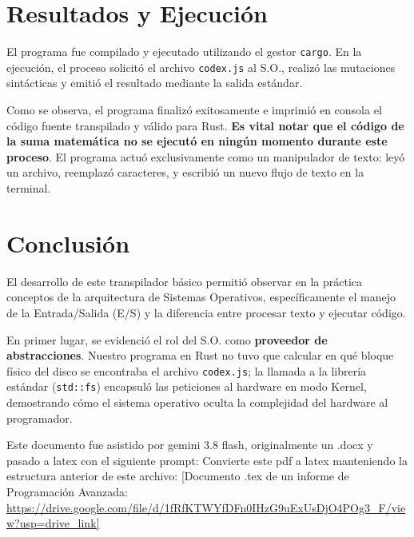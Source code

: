 \documentclass[11pt, letterpaper]{article}
\begin{document}
			


			\section{Resultados y Ejecución}
			
			El programa fue compilado y ejecutado utilizando el gestor \texttt{cargo}. En la ejecución, el proceso solicitó el archivo \texttt{codex.js} al S.O., realizó las mutaciones sintácticas y emitió el resultado mediante la salida estándar.

			
			Como se observa, el programa finalizó exitosamente e imprimió en consola el código fuente transpilado y válido para Rust. \textbf{Es vital notar que el código de la suma matemática no se ejecutó en ningún momento durante este proceso}. El programa actuó exclusivamente como un manipulador de texto: leyó un archivo, reemplazó caracteres, y escribió un nuevo flujo de texto en la terminal.

			\section{Conclusión}
			
			El desarrollo de este transpilador básico permitió observar en la práctica conceptos de la arquitectura de Sistemas Operativos, específicamente el manejo de la Entrada/Salida (E/S) y la diferencia entre procesar texto y ejecutar código.
			
			En primer lugar, se evidenció el rol del S.O. como \textbf{proveedor de abstracciones}. Nuestro programa en Rust no tuvo que calcular en qué bloque físico del disco se encontraba el archivo \texttt{codex.js}; la llamada a la librería estándar (\texttt{std::fs}) encapsuló las peticiones al hardware en modo Kernel, demostrando cómo el sistema operativo oculta la complejidad del hardware al programador.
			
			Este documento fue asistido por gemini 3.8 flash, originalmente un .docx y pasado a latex con el siguiente prompt: Convierte este pdf a latex manteniendo la estructura anterior de este archivo: [Documento .tex de un informe de Programación Avanzada: \url{https://drive.google.com/file/d/1fRfKTWYfDFn0IHzG9uExUsDjO4POg3_F/view?usp=drive_link]}
			
		
\end{document}
